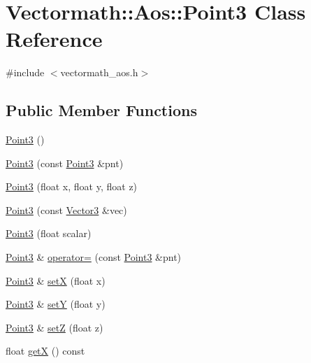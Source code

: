 \hypertarget{classVectormath_1_1Aos_1_1Point3}{\section{Vectormath\-:\-:Aos\-:\-:Point3 Class Reference}
\label{classVectormath_1_1Aos_1_1Point3}
}


{\ttfamily \#include $<$vectormath\-\_\-aos.\-h$>$}

\subsection*{Public Member Functions}
\begin{DoxyCompactItemize}
\item 
\hyperlink{classVectormath_1_1Aos_1_1Point3_a973eba31897962191c032bc585530c49}{Point3} ()
\item 
\hyperlink{classVectormath_1_1Aos_1_1Point3_a03dfaf1fbce8f78dc3569e57034a3fc8}{Point3} (const \hyperlink{classVectormath_1_1Aos_1_1Point3}{Point3} \&pnt)
\item 
\hyperlink{classVectormath_1_1Aos_1_1Point3_a74641a8ac1d99934fea99880a06b58db}{Point3} (float x, float y, float z)
\item 
\hyperlink{classVectormath_1_1Aos_1_1Point3_a0b286492bfd84978c68d9c89c3756596}{Point3} (const \hyperlink{classVectormath_1_1Aos_1_1Vector3}{Vector3} \&vec)
\item 
\hyperlink{classVectormath_1_1Aos_1_1Point3_a52800d18e22d003682c5c2bc9dd3cef4}{Point3} (float scalar)
\item 
\hyperlink{classVectormath_1_1Aos_1_1Point3}{Point3} \& \hyperlink{classVectormath_1_1Aos_1_1Point3_a411758d7b078206e477e0f9d681465ff}{operator=} (const \hyperlink{classVectormath_1_1Aos_1_1Point3}{Point3} \&pnt)
\item 
\hyperlink{classVectormath_1_1Aos_1_1Point3}{Point3} \& \hyperlink{classVectormath_1_1Aos_1_1Point3_a5248262aa8bb9da9e47389788175aa3c}{set\-X} (float x)
\item 
\hyperlink{classVectormath_1_1Aos_1_1Point3}{Point3} \& \hyperlink{classVectormath_1_1Aos_1_1Point3_a3306a2e2e47eb1a9f912f53b57ef8a6c}{set\-Y} (float y)
\item 
\hyperlink{classVectormath_1_1Aos_1_1Point3}{Point3} \& \hyperlink{classVectormath_1_1Aos_1_1Point3_acc8a1cc561400ebde5d83df3999afa5c}{set\-Z} (float z)
\item 
float \hyperlink{classVectormath_1_1Aos_1_1Point3_aae02e04a14cd7d4194ca681df958e08f}{get\-X} () const 

\end{DoxyCompactItemize}
